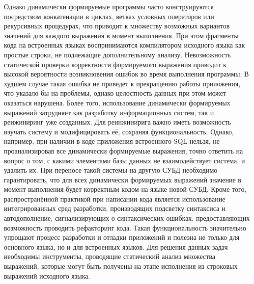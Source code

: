 Однако динамически формируемые программы часто конструируются посредством конкатенации в циклах, ветках условных операторов или рекурсивных процедурах, что приводит к множеству возможных вариантов значений для каждого выражения в момент выполнения. При этом фрагменты кода на встроенных языках воспринимаются компилятором исходного языка как простые строки, не подлежащие дополнительному анализу. Невозможность статической проверки корректности формируемого выражения приводит к высокой вероятности возникновения ошибок во время выполнения программы. В худшем случае такая ошибка не приведет к прекращению работы приложения, что указало бы на проблемы, однако целостность данных при этом может оказаться нарушена. Более того, использование динамически формируемых выражений затрудняет как разработку информационных систем, так и реижиниринг уже созданных. Для реинжинирига важно иметь возможность изучать систему и модифицировать её, сохраняя функциональность. Однако, например, при наличии в коде приложения встроенного SQL нельзя, не проанализировав все динамически формируемые выражения, точно ответить на вопрос о том, с какими элементами базы данных не взаимодействует система, и  удалить их. При переносе такой системы на другую СУБД необходимо гарантировать, что для всех динамически формируемых выражений значение в момент выполнения будет корректным кодом на языке новой СУБД. Кроме того, распространённой практикой при написании кода является использование интегрированных сред разработки, производящих подсветку синтаксиса и автодополнение, сигнализирующих о синтаксических ошибках, предоставляющих возможность проводить рефакторинг кода. Такая функциональность значительно упрощают процесс разработки и отладки приложений и полезна не только для основного языка, но и для встроенных языков. Для решения данных задач необходимы инструменты, проводящие статический анализ множества выражений, которые могут быть получены на этапе исполнения из строковых выражений исходного языка.  

